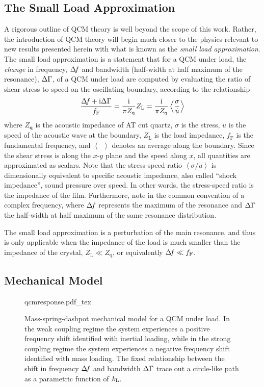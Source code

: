 \subsection{The Small Load Approximation}
A rigorous outline of QCM theory is well beyond the scope of this work.
Rather, the introduction of QCM theory will begin much closer to the
physics relevant to new results presented herein with what is known as the
\textit{small load approximation}.  The small load approximation is a
statement that for a QCM under load, the \textit{change} in frequency,
$\Delta\!f$ and bandwidth (half-width at half maximum of the resonance), $\Delta\Gamma$,
of a QCM under load are computed by evaluating the ratio of shear stress to
speed on the oscillating boundary, according to the
relationship~\cite{eggers1987method}~\cite{johannsmann1992viscoelastic}
\begin{equation}
 \frac{\Delta\!f+{\mathrm{i}}\Delta\Gamma}{f_{\mathrm{F}}}=\frac{{\mathrm{i}}}{\pi Z_{\mathrm{q}}}Z_\mathrm{L} =\frac{{\mathrm{i}}}{\pi Z_{\mathrm{q}}}\left<\frac{\sigma}{\dot{u}}\right>
\label{eqn:comsolextract}
\end{equation}
where $Z_\mathbf{q}$ is the acoustic impedance of AT cut quartz, $\sigma$
is the stress, $\dot{u}$ is the speed of the acoustic wave at the
boundary, $Z_\mathrm{L}$ is the load impedance, $f_{\mathrm{F}}$ is the
fundamental frequency, and $\left<\enspace\right>$ denotes an average
along the boundary.  Since the shear stress is along the $x$-$y$ plane and
the speed along $x$, all quantities are approximated as scalars.
Note that the stress-speed ratio
$\left<\sigma/\dot{u}\right>$ is dimensionally equivalent to specific
acoustic impedance, also called ``shock impedance'', sound pressure over
speed.  In other words, the stress-speed ratio is the impedance of the
film.  Furthermore, note in  the common
convention of a complex frequency, where $\Delta\!f$ represents the maximum of
the resonance and $\Delta\Gamma$ the half-width at half maximum of the same
resonance distribution.

The small load approximation is a perturbation of the main resonance, and
thus is only applicable when the impedance of the load is much smaller than
the impedance of the crystal, $Z_\mathrm{L} \ll Z_\mathrm{q}$, or
equivalently $\Delta\!f \ll f_\mathrm{F}$.

\subsection{Mechanical Model}
\begin{figure}
\centering
{qcmresponse.pdf_tex}
\caption{ Mass-spring-dashpot mechanical model for a QCM under load. In the
weak coupling regime the system experiences a positive frequency shift
identified with inertial loading, while in the strong coupling regime the
system experiences a negative frequency shift identified with mass loading.
The fixed relationship between the shift in frequency $\Delta\!f$ and bandwidth
$\Delta\Gamma$ trace out a circle-like path as a parametric function of $k_\mathrm{L}$.}
\label{fig:mechanicalmodel}
\end{figure}

